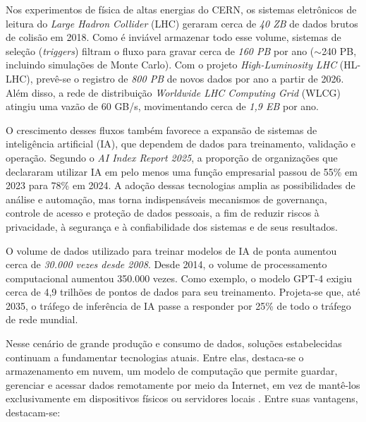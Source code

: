 Nos experimentos de física de altas energias do CERN, os sistemas eletrônicos de leitura do \emph{Large Hadron Collider} (LHC) geraram cerca de \textit{40 \acrshort{ZB}} de dados brutos de colisão em 2018\cite{frontiersbigdata}. Como é inviável armazenar todo esse volume, sistemas de seleção (\emph{triggers}) filtram o fluxo para gravar cerca de \textit{160 \acrshort{PB}} por ano ($\sim$240 \acrshort{PB}, incluindo simulações de Monte Carlo)\cite{frontiersbigdata}. Com o projeto \emph{High-Luminosity LHC} (HL-LHC), prevê-se o registro de \textit{800 \acrshort{PB}} de novos dados por ano a partir de 2026\cite{frontiersbigdata}. Além disso, a rede de distribuição \emph{Worldwide LHC Computing Grid} (WLCG) atingiu uma vazão de 60 GB/s, movimentando cerca de \textit{1,9 \acrshort{EB}} por ano\cite{frontiersbigdata}.

O crescimento desses fluxos também favorece a expansão de sistemas de inteligência artificial (IA), que dependem de dados para treinamento, validação e operação. Segundo o \emph{AI Index Report 2025}, a proporção de organizações que declararam utilizar IA em pelo menos uma função empresarial passou de 55\% em 2023 para 78\% em 2024. A adoção dessas tecnologias amplia as possibilidades de análise e automação, mas torna indispensáveis mecanismos de governança, controle de acesso e proteção de dados pessoais, a fim de reduzir riscos à privacidade, à segurança e à confiabilidade dos sistemas e de seus resultados.

O volume de dados utilizado para treinar modelos de IA de ponta aumentou cerca de \textit{30.000 vezes desde 2008}\cite{energyandai}. Desde 2014, o volume de processamento computacional aumentou 350.000 vezes. Como exemplo, o modelo GPT-4 exigiu cerca de 4,9 trilhões de pontos de dados para seu treinamento. Projeta-se que, até 2035, o tráfego de inferência de IA passe a responder por 25\% de todo o tráfego de rede mundial.

Nesse cenário de grande produção e consumo de dados, soluções estabelecidas continuam a fundamentar tecnologias atuais. Entre elas, destaca-se o armazenamento em nuvem, um modelo de computação que permite guardar, gerenciar e acessar dados remotamente por meio da Internet, em vez de mantê-los exclusivamente em dispositivos físicos ou servidores locais \cite{energyandai}. Entre suas vantagens, destacam-se:

